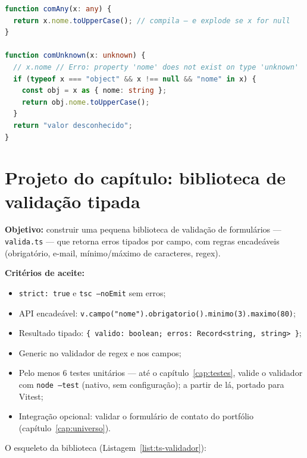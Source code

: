 \begin{lstlisting}[style=livro, language=TypeScript,
  caption={any vs unknown: a diferença que salva.}, label={list:ts-any}]
function comAny(x: any) {
  return x.nome.toUpperCase(); // compila — e explode se x for null
}

function comUnknown(x: unknown) {
  // x.nome // Erro: property 'nome' does not exist on type 'unknown'
  if (typeof x === "object" && x !== null && "nome" in x) {
    const obj = x as { nome: string };
    return obj.nome.toUpperCase();
  }
  return "valor desconhecido";
}
\end{lstlisting}

\section{Projeto do capítulo: biblioteca de validação tipada}
\label{sec:projeto6}

\begin{caixaprojeto}
\textbf{Objetivo:} construir uma pequena biblioteca de validação de
formulários — \texttt{valida.ts} — que retorna erros tipados por campo, com
regras encadeáveis (obrigatório, e-mail, mínimo/máximo de caracteres, regex).

\textbf{Critérios de aceite:}
\begin{itemize}[leftmargin=*, itemsep=0.2em]
  \item \texttt{strict: true} e \texttt{tsc --noEmit} sem erros;
  \item API encadeável: \texttt{v.campo("nome").obrigatorio().minimo(3).maximo(80)};
  \item Resultado tipado: \texttt{\{ valido: boolean; erros: Record<string, string> \}};
  \item Generic no validador de regex e nos campos;
  \item Pelo menos 6 testes unitários — até o capítulo~\ref{cap:testes}, valide
  o validador com \texttt{node --test} (nativo, sem configuração); a partir de
  lá, portado para Vitest;
  \item Integração opcional: validar o formulário de contato do portfólio (capítulo~\ref{cap:universo}).
\end{itemize}
\end{caixaprojeto}

O esqueleto da biblioteca (Listagem~\ref{list:ts-validador}):

